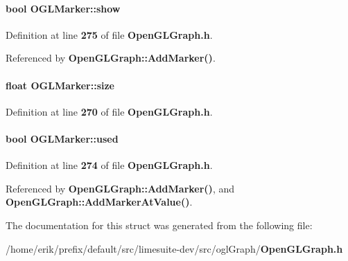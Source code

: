 \paragraph[{show}]{\setlength{\rightskip}{0pt plus 5cm}bool O\+G\+L\+Marker\+::show}\label{structOGLMarker_a80ceb82c4dbb51b7b1103894984c963a}


Definition at line {\bf 275} of file {\bf Open\+G\+L\+Graph.\+h}.



Referenced by {\bf Open\+G\+L\+Graph\+::\+Add\+Marker()}.

\paragraph[{size}]{\setlength{\rightskip}{0pt plus 5cm}float O\+G\+L\+Marker\+::size}\label{structOGLMarker_a75843012dd0514fdf6b96c466b0eee30}


Definition at line {\bf 270} of file {\bf Open\+G\+L\+Graph.\+h}.

\paragraph[{used}]{\setlength{\rightskip}{0pt plus 5cm}bool O\+G\+L\+Marker\+::used}\label{structOGLMarker_a3130e62079d6ecb117c1ea756ba65a70}


Definition at line {\bf 274} of file {\bf Open\+G\+L\+Graph.\+h}.



Referenced by {\bf Open\+G\+L\+Graph\+::\+Add\+Marker()}, and {\bf Open\+G\+L\+Graph\+::\+Add\+Marker\+At\+Value()}.



The documentation for this struct was generated from the following file\+:\begin{DoxyCompactItemize}
\item 
/home/erik/prefix/default/src/limesuite-\/dev/src/ogl\+Graph/{\bf Open\+G\+L\+Graph.\+h}\end{DoxyCompactItemize}
